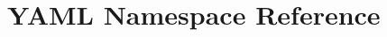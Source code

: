 \hypertarget{namespace_y_a_m_l}{}\section{Y\+A\+M\+L Namespace Reference}
\label{namespace_y_a_m_l}
